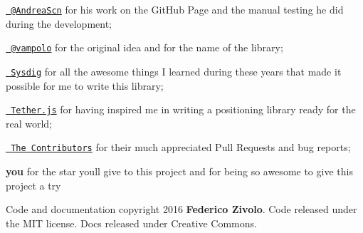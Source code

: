 \begin{DoxyItemize}
\item \href{https://github.com/AndreaScn}{\texttt{ @\+Andrea\+Scn}} for his work on the Git\+Hub Page and the manual testing he did during the development;
\item \href{https://github.com/vampolo}{\texttt{ @vampolo}} for the original idea and for the name of the library;
\item \href{https://github.com/Draios}{\texttt{ Sysdig}} for all the awesome things I learned during these years that made it possible for me to write this library;
\item \href{http://github.hubspot.com/tether/}{\texttt{ Tether.\+js}} for having inspired me in writing a positioning library ready for the real world;
\item \href{https://github.com/FezVrasta/popper.js/graphs/contributors}{\texttt{ The Contributors}} for their much appreciated Pull Requests and bug reports;
\item {\bfseries{you}} for the star you\textquotesingle{}ll give to this project and for being so awesome to give this project a try 🙂
\end{DoxyItemize}

Code and documentation copyright 2016 {\bfseries{Federico Zivolo}}. Code released under the M\+IT license. Docs released under Creative Commons. 